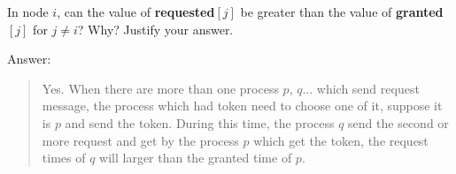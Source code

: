 \documentclass{article}
\begin{document}
\begin{Question} 
\begin{Subquestion}
    In node $i$, can the value of \textbf{requested$[j]$} be greater than the value of \textbf{granted$[j]$} for $j \neq i$? Why? Justify your answer.
    
\begin{answer}
    Answer:
    \begin{quote}
        Yes. When there are more than one process $p$, $q$... which send request message, the process which had token need to choose one of it, suppose it is $p$ and send the token. During this time, the process $q$ send the second or more request and get by the process $p$ which get the token, the request times of $q$ will larger than the granted time of $p$.\\
    \end{quote}
\end{answer}
\end{Subquestion}
\end{Question}
\end{document}
